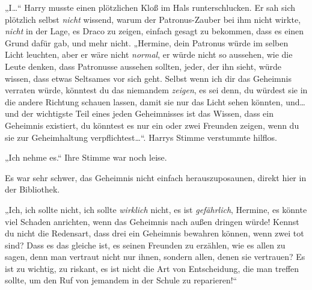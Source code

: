 „I…“ Harry musste einen plötzlichen Kloß im Hals runterschlucken. Er sah sich plötzlich selbst \emph{nicht} wissend, warum der Patronus-Zauber bei ihm nicht wirkte, \emph{nicht} in der Lage, es Draco zu zeigen, einfach gesagt zu bekommen, dass es einen Grund dafür gab, und mehr nicht.
„Hermine, dein Patronus würde im selben Licht leuchten, aber er wäre nicht \emph{normal}, er würde nicht so aussehen, wie die Leute denken, dass Patronusse aussehen sollten, jeder, der ihn sieht, würde wissen, dass etwas Seltsames vor sich geht. Selbst wenn ich dir das Geheimnis verraten würde, könntest du das niemandem \emph{zeigen}, es sei denn, du würdest sie in die andere Richtung schauen lassen, damit sie nur das Licht sehen könnten, und…und der wichtigste Teil eines jeden Geheimnisses ist das Wissen, dass ein Geheimnis existiert, du könntest es nur ein oder zwei Freunden zeigen, wenn du sie zur Geheimhaltung verpflichtest…“. Harrys Stimme verstummte hilflos.

„Ich nehme es.“ Ihre Stimme war noch leise.

Es war sehr schwer, das Geheimnis nicht einfach herauszuposaunen, direkt hier in der Bibliothek.

„Ich, ich sollte nicht, ich sollte \emph{wirklich} nicht, es ist \emph{gefährlich}, Hermine, es könnte viel Schaden anrichten, wenn das Geheimnis nach außen dringen würde! Kennst du nicht die Redensart, dass drei ein Geheimnis bewahren können, wenn zwei tot sind? Dass es das gleiche ist, es seinen Freunden zu erzählen, wie es allen zu sagen, denn man vertraut nicht nur ihnen, sondern allen, denen sie vertrauen? Es ist zu wichtig, zu riskant, es ist nicht die Art von Entscheidung, die man treffen sollte, um den Ruf von jemandem in der Schule zu reparieren!“

